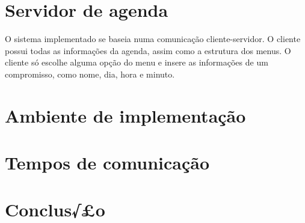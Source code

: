 \documentclass[10pt,a4paper]{article}
\begin{document}
\section{Servidor de agenda}
	O sistema implementado se baseia numa comunicação cliente-servidor. O cliente possui todas as informações da agenda, assim como a estrutura dos menus. O cliente só escolhe alguma opção do menu e insere as informações de um compromisso, como nome, dia, hora e minuto.

\section{Ambiente de implementação}

\section{Tempos de comunicação}   %

\section{Conclus√£o}


\begin{small}
  
\end{small}
\end{document}
